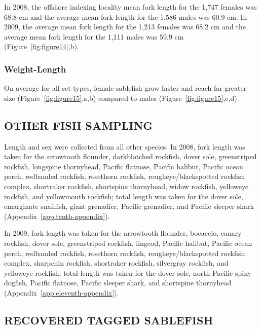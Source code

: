 \documentclass[12pt]{article}\usepackage[]{graphicx}\usepackage[]{color}
\begin{document}
In 2008, the offshore indexing locality mean fork length for the 1,747 females was 68.8 cm and the average mean fork length for the 1,586 males was 60.9 cm. In 2009, the average mean fork length for the 1,213 females was 68.2 cm and the average mean fork length for the 1,111 males was 59.9 cm (Figure~\ref{fig:figure14},b).

\hypertarget{weight-length}{%
\subsubsection{Weight-Length}\label{weight-length}}

On average for all set types, female sablefish grow faster and reach far greater size (Figure~\ref{fig:figure15},a,b) compared to males (Figure~\ref{fig:figure15},c,d).

\hypertarget{other-fish-sampling}{%
\subsection{OTHER FISH SAMPLING}\label{other-fish-sampling}}

Length and sex were collected from all other species. In 2008, fork length was taken for the arrowtooth flounder, darkblotched rockfish, dover sole, greenstriped rockfish, longspine thornyhead, Pacific flatnose, Pacific halibut, Pacific ocean perch, redbanded rockfish, rosethorn rockfish, rougheye/blackspotted rockfish complex, shortraker rockfish, shortspine thornyhead, widow rockfish, yelloweye rockfish, and yellowmouth rockfish; total length was taken for the dover sole, emarginate snailfish, giant grenadier, Pacific grenadier, and Pacific sleeper shark (Appendix~\ref{app:tenth-appendix}).

In 2009, fork length was taken for the arrowtooth flounder, bocaccio, canary rockfish, dover sole, greenstriped rockfish, lingcod, Pacific halibut, Pacific ocean perch, redbanded rockfish, rosethorn rockfish, rougheye/blackspotted rockfish complex, sharpchin rockfish, shortraker rockfish, silvergray rockfish, and yelloweye rockfish; total length was taken for the dover sole, north Pacific spiny dogfish, Pacific flatnose, Pacific sleeper shark, and shortspine thornyhead (Appendix~\ref{app:eleventh-appendix}).

\hypertarget{recovered-tagged-sablefish}{%
\subsection{RECOVERED TAGGED SABLEFISH}\label{recovered-tagged-sablefish}}
\end{document}
